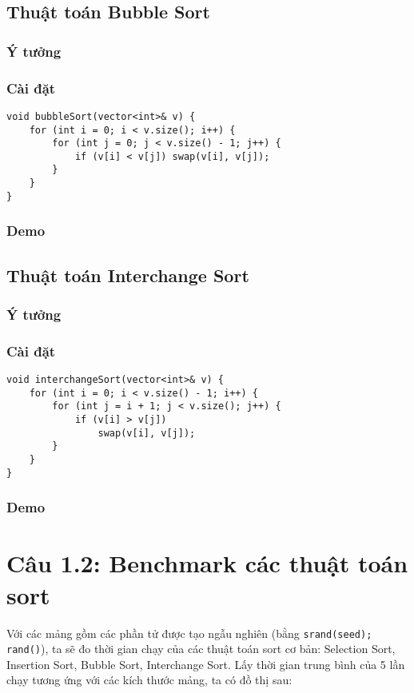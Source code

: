 \subsection{Thuật toán Bubble Sort}
\subsubsection{Ý tưởng}
\subsubsection{Cài đặt}
\begin{verbatim}
void bubbleSort(vector<int>& v) {
    for (int i = 0; i < v.size(); i++) {
        for (int j = 0; j < v.size() - 1; j++) {
            if (v[i] < v[j]) swap(v[i], v[j]);
        }
    }
}
\end{verbatim}
\subsubsection{Demo}

\subsection{Thuật toán Interchange Sort}
\subsubsection{Ý tưởng}
\subsubsection{Cài đặt}
\begin{verbatim}
void interchangeSort(vector<int>& v) {
    for (int i = 0; i < v.size() - 1; i++) {
        for (int j = i + 1; j < v.size(); j++) {
            if (v[i] > v[j])
                swap(v[i], v[j]);
        }
    }
}
\end{verbatim}
\subsubsection{Demo}


\section{Câu 1.2: Benchmark các thuật toán sort}

Với các mảng gồm các phần tử được tạo ngẫu nghiên (bằng \texttt{srand(seed); rand()}),
ta sẽ đo thời gian chạy của các thuật toán sort cơ bản: Selection Sort, Insertion Sort, Bubble Sort, Interchange Sort.
Lấy thời gian trung bình của 5 lần chạy tương ứng với các kích thước mảng, ta có đồ thị sau:

